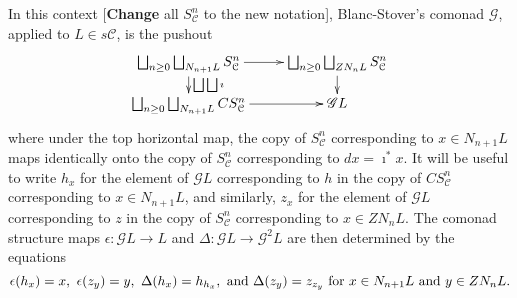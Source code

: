 \documentclass[11pt]{amsart}
\theoremstyle{plain}
\theoremstyle{definition}
\renewcommand{\to}{\longrightarrow}
\newcommand{\scrG}{\mathscr{G}}
\newcommand{\calC}{\mathcal{C}}
\newcommand{\calV}{\mathcal{V}}
\theoremstyle{plain}
\newcommand{\vect}[2]{\calV^{#1}_{#2}}
\newcommand{\BSW}{{\scrG}}
\newcommand{\F}{\mathbb{F}}
\newcommand{\complexes}{\textup{ch}_+}
\begin{document}
\begin{Composite functor spectral sequences}

In this context [\textbf{Change} all $S_\calC^n$ to the new notation], Blanc-Stover's comonad $\BSW$, applied to $L\in s\calC$, is the pushout
\[\xymatrix@R=4mm{
\bigsqcup_{n\geq0}\bigsqcup_{N_{n+1}L}S_\calC^n
\ar[r]\ar[d]^-{\bigsqcup\bigsqcup\imath}
&%
\bigsqcup_{n\geq0}\bigsqcup_{ZN_{n}L}S_\calC^n\ar[d]\\%
\bigsqcup_{n\geq0}\bigsqcup_{N_{n+1}L}CS_\calC^n
\ar[r]&%
\BSW L%
}\]
where under the top horizontal map, the copy of $S^n_\calC$ corresponding to $x\in N_{n+1}L$ maps identically onto the copy of $S^n_\calC$ corresponding to $dx=\imath^*x$. It will be useful to write $h_x$ for the element of $\BSW L$ corresponding to $h$ in the copy of $CS^n_\calC$ corresponding to $x\in N_{n+1}L$, and similarly, $z_x$ for the element of $\BSW L$ corresponding to $z$ in the copy of $S^n_\calC$ corresponding to $x\in ZN_{n}L$. The comonad structure maps $\epsilon:\BSW L\to L$ and $\Delta:\BSW L\to \BSW^2L$ are then determined by the equations
\[\epsilon(h_x)=x,\ \epsilon(z_y)=y,\ \Delta(h_x)=h_{h_x},\textup{ and }\Delta(z_y)=z_{z_y}\textup{ for $x\in N_{n+1}L$ and $y\in ZN_nL$.}\]


\end{Composite functor spectral sequences}
\end{document}
